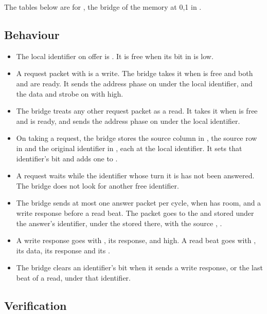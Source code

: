The tables below are for , the bridge of the memory at 0,1 in .


\subsection*{Behaviour}

\begin{itemize}
\item The local identifier on offer is . It is free when its
bit in  is low.
\item A request packet with   is a write. The bridge
takes it when  is free and both  and  are
ready. It sends the address phase on  under the local
identifier, and the data and strobe on  with  high.
\item The bridge treats any other request packet as a read. It takes it
when  is free and  is ready, and sends the address
phase on  under the local identifier.
\item On taking a request, the bridge stores the source column in
, the source row in  and the original identifier in
, each at the local identifier. It sets that identifier's
 bit and adds one to .
\item A request waits while the identifier whose turn it is has not
been answered. The bridge does not look for another free identifier.
\item The bridge sends at most one answer packet per cycle, when
 has room, and a write response before a read beat. The
packet goes to the  and  stored under the answer's
identifier, under the  stored there, with the source
, .
\item A write response goes with  , its response,
and  high. A read beat goes with  , its
data, its response and its .
\item The bridge clears an identifier's  bit when it sends a
write response, or the last beat of a read, under that identifier.
\end{itemize}

\subsection*{Verification}

